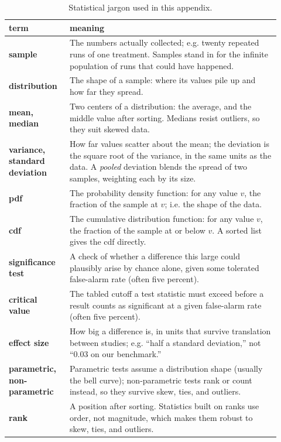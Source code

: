 \begin{table}[t]
\caption{Statistical jargon used in this appendix.}
\label{tbl:jargon}
\small
\begin{tabular}{@{}p{0.2\linewidth}p{0.72\linewidth}@{}}
\toprule
term & meaning\\
\midrule
\textbf{sample} &
  The numbers actually collected; e.g. twenty repeated runs of
  one treatment.
  Samples stand in for the infinite population of runs that
  could have happened.\\
\textbf{distribution} &
  The shape of a sample: where its values pile up and how far
  they spread.\\
\textbf{mean, median} &
  Two centers of a distribution: the average, and the middle
  value after sorting.
  Medians resist outliers, so they suit skewed data.\\
\textbf{variance, standard deviation} &
  How far values scatter about the mean; the deviation is the
  square root of the variance, in the same units as the data.
  A \emph{pooled} deviation blends the spread of two samples,
  weighting each by its size.\\
\textbf{pdf} &
  The probability density function: for any value $v$, the
  fraction of the sample at $v$; i.e. the shape of the data.\\
\textbf{cdf} &
  The cumulative distribution function: for any value $v$, the
  fraction of the sample at or below $v$.
  A sorted list gives the cdf directly.\\
\textbf{significance test} &
  A check of whether a difference this large could plausibly
  arise by chance alone, given some tolerated false-alarm rate
  (often five percent).\\
\textbf{critical value} &
  The tabled cutoff a test statistic must exceed before a
  result counts as significant at a given false-alarm rate
  (often five percent).\\
\textbf{effect size} &
  How big a difference is, in units that survive translation
  between studies; e.g. ``half a standard deviation,'' not
  ``0.03 on our benchmark.''\\
\textbf{parametric, non-parametric} &
  Parametric tests assume a distribution shape (usually the
  bell curve); non-parametric tests rank or count instead, so
  they survive skew, ties, and outliers.\\
\textbf{rank} &
  A position after sorting.
  Statistics built on ranks use order, not magnitude, which
  makes them robust to skew, ties, and outliers.\\
\bottomrule
\end{tabular}
\end{table}

